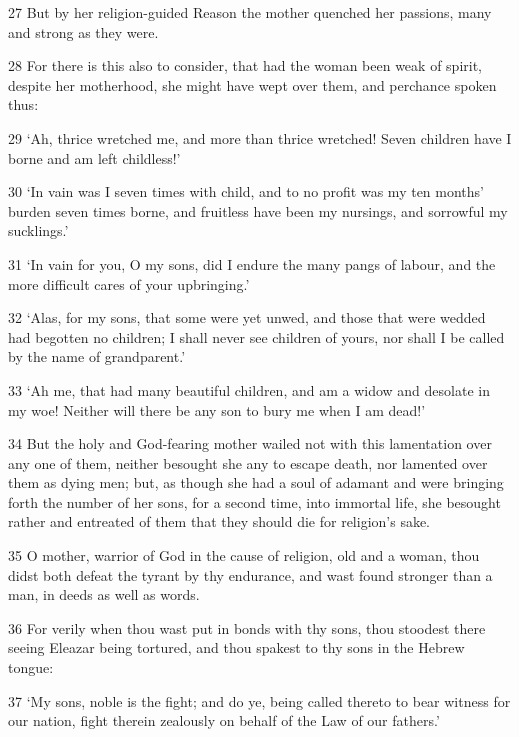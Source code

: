 \par 27 But by her religion-guided Reason the mother quenched her passions, many and strong as they were.

\par 28 For there is this also to consider, that had the woman been weak of spirit, despite her motherhood, she might have wept over them, and perchance spoken thus:

\par 29 ‘Ah, thrice wretched me, and more than thrice wretched! Seven children have I borne and am left childless!’

\par 30 ‘In vain was I seven times with child, and to no profit was my ten months' burden seven times borne, and fruitless have been my nursings, and sorrowful my sucklings.’

\par 31 ‘In vain for you, O my sons, did I endure the many pangs of labour, and the more difficult cares of your upbringing.’

\par 32 ‘Alas, for my sons, that some were yet unwed, and those that were wedded had begotten no children; I shall never see children of yours, nor shall I be called by the name of grandparent.’

\par 33 ‘Ah me, that had many beautiful children, and am a widow and desolate in my woe! Neither will there be any son to bury me when I am dead!’

\par 34 But the holy and God-fearing mother wailed not with this lamentation over any one of them, neither besought she any to escape death, nor lamented over them as dying men; but, as though she had a soul of adamant and were bringing forth the number of her sons, for a second time, into immortal life, she besought rather and entreated of them that they should die for religion's sake.

\par 35 O mother, warrior of God in the cause of religion, old and a woman, thou didst both defeat the tyrant by thy endurance, and wast found stronger than a man, in deeds as well as words.

\par 36 For verily when thou wast put in bonds with thy sons, thou stoodest there seeing Eleazar being tortured, and thou spakest to thy sons in the Hebrew tongue:

\par 37 ‘My sons, noble is the fight; and do ye, being called thereto to bear witness for our nation, fight therein zealously on behalf of the Law of our fathers.’

